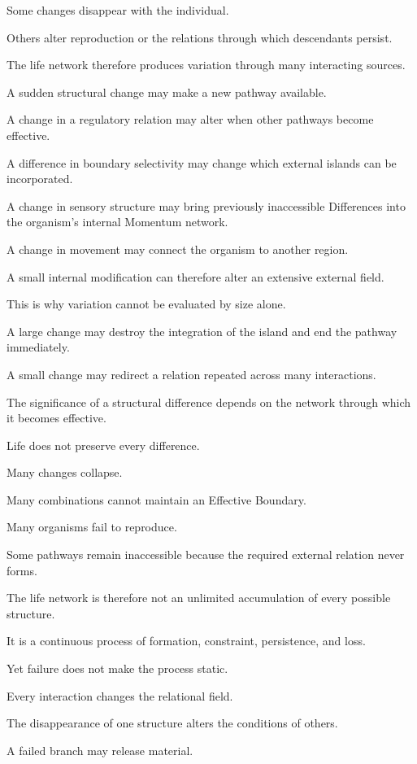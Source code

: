 Some changes disappear with the individual.

Others alter reproduction or the relations through which descendants persist.

The life network therefore produces variation through many interacting sources.

A sudden structural change may make a new pathway available.

A change in a regulatory relation may alter when other pathways become effective.

A difference in boundary selectivity may change which external islands can be incorporated.

A change in sensory structure may bring previously inaccessible Differences into the organism’s internal Momentum network.

A change in movement may connect the organism to another region.

A small internal modification can therefore alter an extensive external field.

This is why variation cannot be evaluated by size alone.

A large change may destroy the integration of the island and end the pathway immediately.

A small change may redirect a relation repeated across many interactions.

The significance of a structural difference depends on the network through which it becomes effective.

Life does not preserve every difference.

Many changes collapse.

Many combinations cannot maintain an Effective Boundary.

Many organisms fail to reproduce.

Some pathways remain inaccessible because the required external relation never forms.

The life network is therefore not an unlimited accumulation of every possible structure.

It is a continuous process of formation, constraint, persistence, and loss.

Yet failure does not make the process static.

Every interaction changes the relational field.

The disappearance of one structure alters the conditions of others.

A failed branch may release material.

